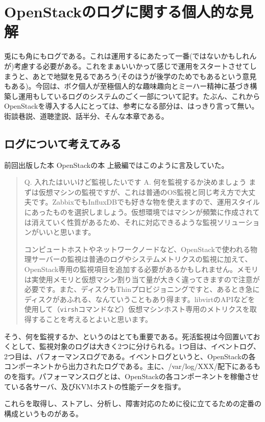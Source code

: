 \chapter{OpenStackのログに関する個人的な見解}
\setcounter{page}{1}

兎にも角にもログである。これは運用するにあたって一番(ではないかもしれんが)考慮する必要がある。これをまぁいいかって感じで運用をスタートさせてしまうと、あとで地獄を見るであろう(そのほうが後学のためでもあるという意見もある)。今回は、ボク個人が至極個人的な趣味趣向とミーハー精神に基づき構築し運用もしているログのシステムのごく一部について記す。たぶん、これからOpenStackを導入する人にとっては、参考になる部分は、はっきり言って無い。街談巷説、道聴塗説、話半分、そんな本章である。

\section{ログについて考えてみる}
前回出版した本 OpenStackの本 上級編ではこのように言及していた。

\begin{quotation}
	Q. 入れたはいいけど監視したいです
	A. 何を監視するか決めましょう
	まずは仮想マシンの監視ですが、これは普通のOS監視と同じ考え方で大丈夫です。ZabbixでもInfluxDBでも好きな物を使えますので、運用スタイルにあったものを選択しましょう。仮想環境ではマシンが頻繁に作成されては消えていく性質があるため、それに対応できるような監視ソリューションがいいと思います。

	コンピュートホストやネットワークノードなど、OpenStackで使われる物理サーバーの監視は普通のログやシステムメトリクスの監視に加えて、OpenStack専用の監視項目を追加する必要があるかもしれません。メモリは実使用メモリと仮想マシン割り当て量が大きく違ってきますので注意が必要です。また、ディスクもThinプロビジョニングですと、あるとき急にディスクがあふれる、なんていうこともあり得ます。libvirtのAPIなどを使用して（\verb|virsh|コマンドなど）仮想マシンホスト専用のメトリクスを取得することを考えるとよいと思います。
\end{quotation}

そう、何を監視するか、というのはとても重要である。死活監視は今回置いておくとして、監視対象のログは大きく2つに分けられる。1つ目は、イベントログ、2つ目は、パフォーマンスログである。イベントログというと、OpenStackの各コンポーネントから出力されたログである。主に、/var/log/XXX/配下にあるものを指す。パフォーマンスログとは、OpenStackの各コンポーネントを稼働させている各サーバ、及びKVMホストの性能データを指す。

これらを取得し、ストアし、分析し、障害対応のために役に立てるための定番の構成というものがある。

